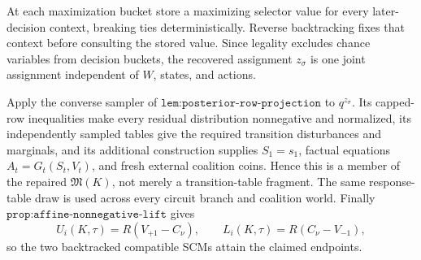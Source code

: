 At each maximization bucket store a maximizing selector value for every later-decision context, breaking ties deterministically.  Reverse backtracking fixes that context before consulting the stored value.  Since legality excludes chance variables from decision buckets, the recovered assignment \(z_\sigma\) is one joint assignment independent of \(W\), states, and actions.

Apply the converse sampler of \(\texttt{lem:posterior-row-projection}\) to \(q^{z_\sigma}\).  Its capped-row inequalities make every residual distribution nonnegative and normalized, its independently sampled tables give the required transition disturbances and marginals, and its additional construction supplies \(S_1=s_1\), factual equations \(A_t=G_t(S_t,V_t)\), and fresh external coalition coins.  Hence this is a member of the repaired \(\mathfrak M(K)\), not merely a transition-table fragment.  The same response-table draw is used across every circuit branch and coalition world.  Finally \(\texttt{prop:affine-nonnegative-lift}\) gives
\[
 U_i(K,\tau)=R(V_{+1}-C_\nu),
 \qquad L_i(K,\tau)=R(C_\nu-V_{-1}),
\]
so the two backtracked compatible SCMs attain the claimed endpoints.